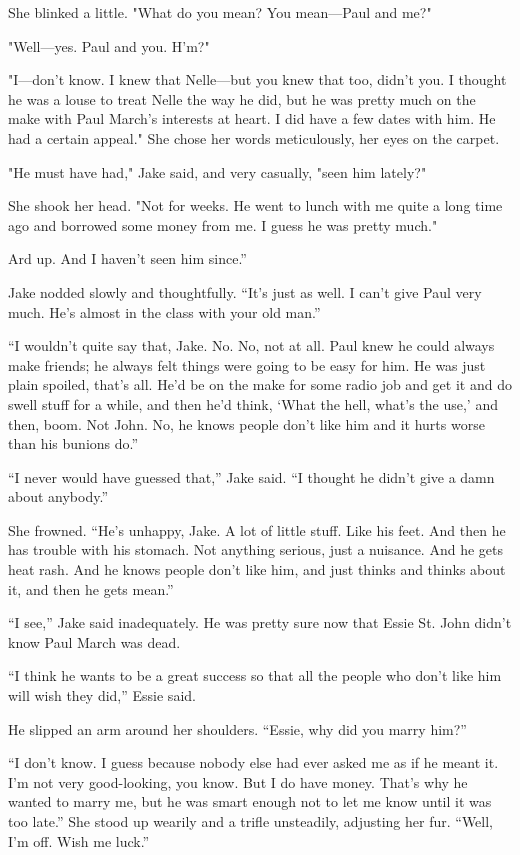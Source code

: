 \documentclass{novel}
\begin{document}
She blinked a little. "What do you mean? You mean—Paul and me?"

"Well—yes. Paul and you. H'm?"

"I—don't know. I knew that Nelle—but you knew that too, didn't you. I thought he was a louse to treat Nelle the way he did, but he was pretty much on the make with Paul March's interests at heart. I did have a few dates with him. He had a certain appeal." She chose her words meticulously, her eyes on the carpet.

"He must have had," Jake said, and very casually, "seen him lately?"

She shook her head. "Not for weeks. He went to lunch with me quite a long time ago and borrowed some money from me. I guess he was pretty much."

Ard up. And I haven’t seen him since.”

Jake nodded slowly and thoughtfully. “It’s just as well. I can’t give Paul very much. He’s almost in the class with your old man.”

“I wouldn’t quite say that, Jake. No. No, not at all. Paul knew he could always make friends; he always felt things were going to be easy for him. He was just plain spoiled, that’s all. He’d be on the make for some radio job and get it and do swell stuff for a while, and then he’d think, ‘What the hell, what’s the use,’ and then, boom. Not John. No, he knows people don’t like him and it hurts worse than his bunions do.”

“I never would have guessed that,” Jake said. “I thought he didn’t give a damn about anybody.”

She frowned. “He’s unhappy, Jake. A lot of little stuff. Like his feet. And then he has trouble with his stomach. Not anything serious, just a nuisance. And he gets heat rash. And he knows people don’t like him, and just thinks and thinks about it, and then he gets mean.”

“I see,” Jake said inadequately. He was pretty sure now that Essie St. John didn’t know Paul March was dead.

“I think he wants to be a great success so that all the people who don’t like him will wish they did,” Essie said.

He slipped an arm around her shoulders. “Essie, why did you marry him?”

“I don’t know. I guess because nobody else had ever asked me as if he meant it. I’m not very good-looking, you know. But I do have money. That’s why he wanted to marry me, but he was smart enough not to let me know until it was too late.” She stood up wearily and a trifle unsteadily, adjusting her fur. “Well, I’m off. Wish me luck.”
\end{document}

